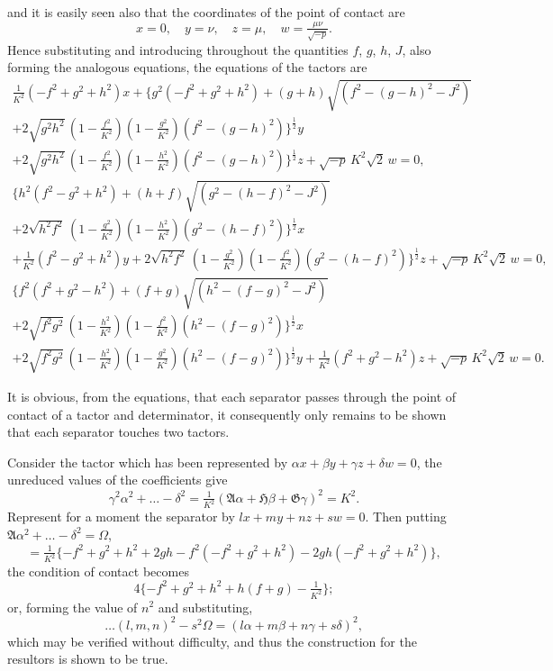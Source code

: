 \documentclass[11pt,a4paper]{book}
\begin{document}
\newpage
\setcounter{page}{82}

and it is easily seen also that the coordinates of the point of contact are
\[
x = 0, \quad y = \nu, \quad z = \mu, \quad w = \tfrac{\mu\nu}{\sqrt{-p}}.
\]
Hence substituting and introducing throughout the quantities $f$, $g$, $h$, $J$, also forming the analogous equations, the equations of the tactors are
\begin{multline*}
\tfrac{1}{K^2}(-f^2+g^2+h^2)x + \{g^2(-f^2+g^2+h^2)+(g+h)\sqrt{(f^2-(g-h)^2-J^2)}\\
+ 2\sqrt{g^2h^2}\,(1-\tfrac{f^2}{K^2})(1-\tfrac{g^2}{K^2})(f^2-(g-h)^2)\}^{\frac{1}{2}}y\\
+ 2\sqrt{g^2h^2}\,(1-\tfrac{f^2}{K^2})(1-\tfrac{h^2}{K^2})(f^2-(g-h)^2)\}^{\frac{1}{2}}z + \sqrt{-p}\,K^2\sqrt{2}\,w = 0,
\end{multline*}
\begin{multline*}
\{h^2(f^2-g^2+h^2)+(h+f)\sqrt{(g^2-(h-f)^2-J^2)}\\
+ 2\sqrt{h^2f^2}\,(1-\tfrac{g^2}{K^2})(1-\tfrac{h^2}{K^2})(g^2-(h-f)^2)\}^{\frac{1}{2}}x\\
+ \tfrac{1}{K^2}(f^2-g^2+h^2)y + 2\sqrt{h^2f^2}\,(1-\tfrac{g^2}{K^2})(1-\tfrac{f^2}{K^2})(g^2-(h-f)^2)\}^{\frac{1}{2}}z + \sqrt{-p}\,K^2\sqrt{2}\,w = 0,
\end{multline*}
\begin{multline*}
\{f^2(f^2+g^2-h^2)+(f+g)\sqrt{(h^2-(f-g)^2-J^2)}\\
+ 2\sqrt{f^2g^2}\,(1-\tfrac{h^2}{K^2})(1-\tfrac{f^2}{K^2})(h^2-(f-g)^2)\}^{\frac{1}{2}}x\\
+ 2\sqrt{f^2g^2}\,(1-\tfrac{h^2}{K^2})(1-\tfrac{g^2}{K^2})(h^2-(f-g)^2)\}^{\frac{1}{2}}y + \tfrac{1}{K^2}(f^2+g^2-h^2)z + \sqrt{-p}\,K^2\sqrt{2}\,w = 0.
\end{multline*}

\newpage
\setcounter{page}{83}

It is obvious, from the equations, that each separator passes through the point of contact of a tactor and determinator, it consequently only remains to be shown that each separator touches two tactors.

Consider the tactor which has been represented by $\alpha x+\beta y+\gamma z+\delta w=0$, the unreduced values of the coefficients give
\[
\gamma^2\alpha^2+\ldots-\delta^2 = \tfrac{1}{K^2}(\mathfrak{A}\alpha+\mathfrak{H}\beta+\mathfrak{G}\gamma)^2 = K^2.
\]
Represent for a moment the separator by $lx+my+nz+sw=0$. Then putting $\mathfrak{A}\alpha^2+\ldots-\delta^2=\Omega$,
\[
= \tfrac{1}{K^2}\{-f^2+g^2+h^2+2gh-f^2(-f^2+g^2+h^2)-2gh(-f^2+g^2+h^2)\},
\]
the condition of contact becomes
\[
4\{-f^2+g^2+h^2+h(f+g)-\tfrac{1}{K^2}\};
\]
or, forming the value of $n^2$ and substituting,
\[
\ldots(l,m,n)^2 - s^2\Omega = (l\alpha+m\beta+n\gamma+s\delta)^2,
\]
which may be verified without difficulty, and thus the construction for the resultors is shown to be true.
\end{document}
